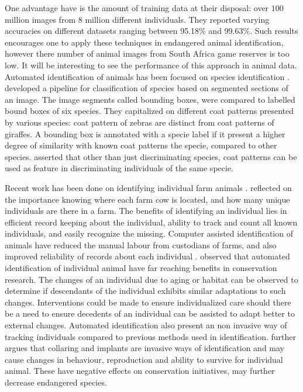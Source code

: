  One advantage \citeauthor{schroff2015facenet} \citeyear{schroff2015facenet} \cite{schroff2015facenet} have is the amount of training data at their disposal: over  $100$ million images from $8$ million different individuals. They reported varying accuracies on different datasets ranging between 95.18\% and 99.63\%. Such results encourages one to apply these techniques in endangered animal identification, however there number of animal images from South Africa game reserves is too low. It will be interesting to see the performance of this approach in animal data. 
Automated identification of animals has been focused on species identification \cite{parham2018animal}. \citeauthor{norouzzadeh2018automatically} \citeyear{norouzzadeh2018automatically} \cite{norouzzadeh2018automatically} developed a pipeline for classification of species based on segmented sections of an image. The image segments called bounding boxes, were compared to labelled bound boxes of six species. They capitalized on different coat patterns presented by various species: coat pattern of zebras are distinct from coat patterns of giraffes. A bounding box is annotated with a specie label if it present a higher degree of similarity with known coat patterns the specie, compared to other species. \citeauthor{kuhl2013animal} \citeyear{kuhl2013animal} \cite{kuhl2013animal} asserted that other than just discriminating species, coat patterns can be used as feature in discriminating individuals of the same specie.

Recent work has been done on identifying individual farm animals \cite{kumar2017real}. \citeauthor{kumar2017real} \citeyear{kumar2017real} \cite{kumar2017real} reflected on the importance knowing where each farm cow is located, and how many unique individuals are there in a farm. The benefits of identifying an individual lies in efficient record keeping about the individual, ability to track and count all known individuals, and easily recognize the missing. Computer assisted  identification of animals have reduced the manual labour from custodians of farms, and also improved reliability of records about each individual \cite{kuhl2013animal}. \citeauthor{kuhl2013animal} \citeyear{kuhl2013animal} \cite{kuhl2013animal} observed that automated identification of individual animal have far reaching benefits in conservation research. The changes of an individual due to aging or habitat can be observed to determine if descendants of the individual exhibits similar adaptations to such changes. Interventions could be made to ensure individualized care should there be a need to ensure decedents of an individual can be assisted to adapt better to external changes. Automated identification also present an non invasive way of tracking individuals compared to previous methods used in identification. \citeauthor{kuhl2013animal} \citeyear{kuhl2013animal} \cite{kuhl2013animal} further argues that collaring and implants are invasive ways of identification and may cause changes in behaviour, reproduction and ability to survive for individual animal. These have negative effects on conservation initiatives, may further decrease endangered species.

